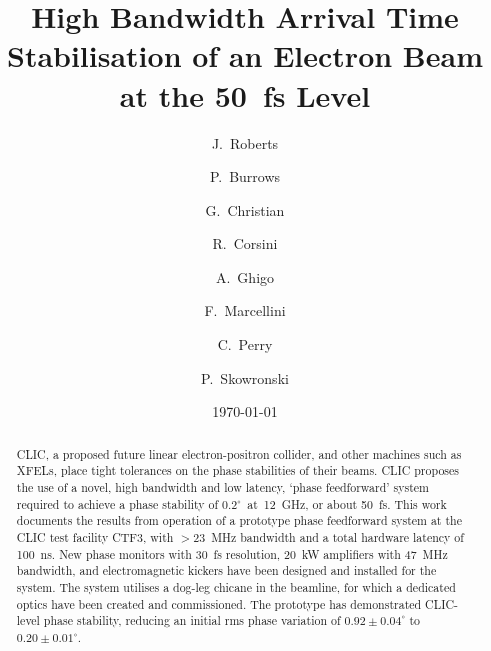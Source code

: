 \documentclass[%
 reprint,
superscriptaddress,
 amsmath,amssymb,
 prl,
]{revtex4-1}
\begin{document}

\title{High Bandwidth Arrival Time Stabilisation of an Electron Beam at 
the 
50~fs Level}

\author{J.~Roberts}

\author{P.~Burrows}

\author{G.~Christian}

\author{R.~Corsini}

\author{A.~Ghigo}

\author{F.~Marcellini}

\author{C.~Perry}

\author{P.~Skowronski}

\date{\today}

\begin{abstract}
CLIC, a proposed future linear electron-positron collider, and other machines 
such as XFELs, place tight tolerances on the phase stabilities of their beams. 
CLIC proposes the use of a novel, high bandwidth and low latency, `phase 
feedforward' system required to achieve a phase stability of 
\(0.2^\circ\)~at~12~GHz, or 
about 50~fs. This work documents the results from operation of a prototype 
phase 
feedforward system at the CLIC test facility CTF3, with \(>23\)~MHz bandwidth 
and a 
total hardware latency of 100~ns. New phase monitors with 
30~fs resolution, 20~kW amplifiers with 47~MHz bandwidth, and electromagnetic 
kickers have been designed and installed for the system. The system utilises a 
dog-leg chicane in the beamline, for which a dedicated optics have been created 
and 
commissioned. The prototype has demonstrated CLIC-level phase stability, 
reducing an initial rms phase variation of \(0.92\pm0.04^\circ\) to 
\(0.20\pm0.01^\circ\).
\end{abstract}

\maketitle
\end{document}
